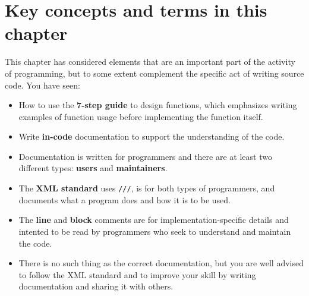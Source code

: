 \documentclass[fsharpNotes.tex]{subfiles}
\begin{document}
\section{Key concepts and terms in this chapter}
This chapter has considered elements that are an important part of the activity of programming, but to some extent complement the specific act of writing source code. You have seen:
\begin{itemize}
\item How to use the \textbf{7-step guide} to design functions, which emphasizes writing examples of function usage before implementing the function itself.
\item Write \textbf{in-code} documentation to support the understanding of the code. 
\item Documentation is written for programmers and there are at least two different types: \textbf{users} and \textbf{maintainers}. 
\item The \textbf{XML standard} uses \lstinline{///}, is for both types of programmers, and documents what a program does and how it is to be used.
\item The \textbf{line} and \textbf{block} comments are for implementation-specific details and intented to be read by programmers who seek to understand and maintain the code. 
\item There is no such thing as the correct documentation, but you are well advised to follow the XML standard and to improve your skill by writing documentation and sharing it with others.
\end{itemize}
\end{document}
